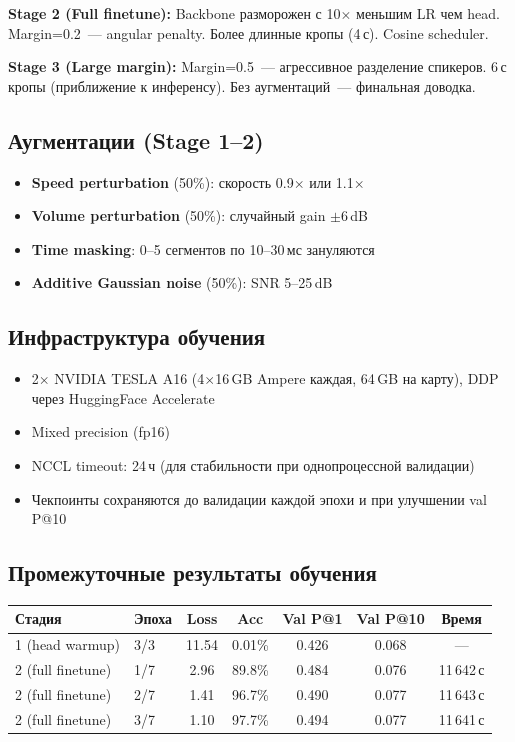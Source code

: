 \documentclass[12pt,a4paper]{article}
\begin{document}
\textbf{Stage 2 (Full finetune):} Backbone разморожен с 10$\times$ меньшим LR чем head. Margin=0.2~--- angular penalty. Более длинные кропы (4\,с). Cosine scheduler.

\textbf{Stage 3 (Large margin):} Margin=0.5~--- агрессивное разделение спикеров. 6\,с кропы (приближение к инференсу). Без аугментаций~--- финальная доводка.

\subsection{Аугментации (Stage 1--2)}

\begin{itemize}
  \item \textbf{Speed perturbation} (50\%): скорость 0.9$\times$ или 1.1$\times$
  \item \textbf{Volume perturbation} (50\%): случайный gain $\pm$6\,dB
  \item \textbf{Time masking}: 0--5 сегментов по 10--30\,мс зануляются
  \item \textbf{Additive Gaussian noise} (50\%): SNR 5--25\,dB
\end{itemize}

\subsection{Инфраструктура обучения}

\begin{itemize}
  \item 2$\times$ NVIDIA TESLA A16 (4$\times$16\,GB Ampere каждая, 64\,GB на карту), DDP через HuggingFace Accelerate
  \item Mixed precision (fp16)
  \item NCCL timeout: 24\,ч (для стабильности при однопроцессной валидации)
  \item Чекпоинты сохраняются до валидации каждой эпохи и при улучшении val P@10
\end{itemize}

\subsection{Промежуточные результаты обучения}

\begin{tabular}{l l c c c c c}
\hline
Стадия & Эпоха & Loss & Acc & Val P@1 & Val P@10 & Время \\
\hline
1 (head warmup) & 3/3 & 11.54 & 0.01\% & 0.426 & 0.068 & --- \\
2 (full finetune) & 1/7 & 2.96 & 89.8\% & 0.484 & 0.076 & 11\,642\,с \\
2 (full finetune) & 2/7 & 1.41 & 96.7\% & 0.490 & 0.077 & 11\,643\,с \\
2 (full finetune) & 3/7 & 1.10 & 97.7\% & 0.494 & 0.077 & 11\,641\,с \\
\hline
\end{tabular}
\end{document}
